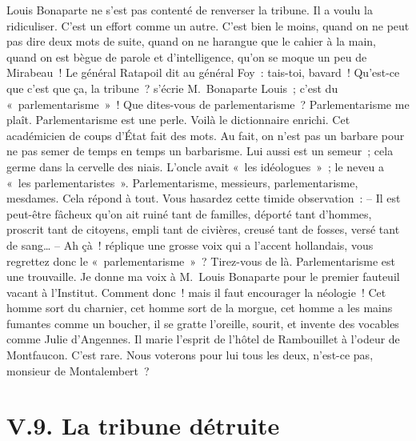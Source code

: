 \documentclass[french,twoside]{book} %
\begin{document}
Louis Bonaparte ne s’est pas contenté de renverser la tribune. Il a voulu la ridiculiser. C’est un effort comme un autre. C’est bien le moins, quand on ne peut pas dire deux mots de suite, quand on ne harangue que le cahier à la main, quand on est bègue de parole et d’intelligence, qu’on se moque un peu de Mirabeau ! Le général Ratapoil dit au général Foy : tais-toi, bavard ! Qu’est-ce que c’est que ça, la tribune ? s’écrie M. Bonaparte Louis ; c’est du « parlementarisme » ! Que dites-vous de parlementarisme ? Parlementarisme me plaît. Parlementarisme est une perle. Voilà le dictionnaire enrichi. Cet académicien de coups d’État fait des mots. Au fait, on n’est pas un barbare pour ne pas semer de temps en temps un barbarisme. Lui aussi est un semeur ; cela germe dans la cervelle des niais. L’oncle avait « les idéologues » ; le neveu a « les parlementaristes ». Parlementarisme, messieurs, parlementarisme, mesdames. Cela répond à tout. Vous hasardez cette timide observation : – Il est peut-être fâcheux qu’on ait ruiné tant de familles, déporté tant d’hommes, proscrit tant de citoyens, empli tant de civières, creusé tant de fosses, versé tant de sang… – Ah çà ! réplique une grosse voix qui a l’accent hollandais, vous regrettez donc le « parlementarisme » ? Tirez-vous de là. Parlementarisme est une trouvaille. Je donne ma voix à M. Louis Bonaparte pour le premier fauteuil vacant à l’Institut. Comment donc ! mais il faut encourager la néologie ! Cet homme sort du charnier, cet homme sort de la morgue, cet homme a les mains fumantes comme un boucher, il se gratte l’oreille, sourit, et invente des vocables comme Julie d’Angennes. Il marie l’esprit de l’hôtel de Rambouillet à l’odeur de Montfaucon. C’est rare. Nous voterons pour lui tous les deux, n’est-ce pas, monsieur de Montalembert ?

\section[{V.9. La tribune détruite}]{V.9. La tribune détruite}
\end{document}
